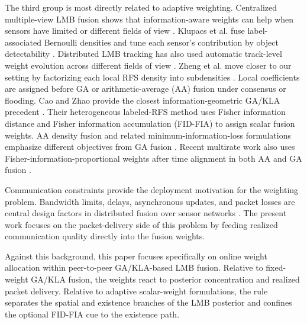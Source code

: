 The third group is most directly related to adaptive weighting. Centralized multiple-view LMB fusion shows that information-aware weights can help when sensors have limited or different fields of view \cite{Wang2018CentralizedLMBFusion,Gostar2021CentralizedCooperativeLMB}. Klupacs et al. fuse label-associated Bernoulli densities and tune each sensor's contribution by object detectability \cite{Klupacs2023ComplementaryFusion}. Distributed LMB tracking has also used automatic track-level weight evolution across different fields of view \cite{Shen2022ConsensusLMB}. Zheng et al. move closer to our setting by factorizing each local RFS density into subdensities \cite{Zheng2026DistributedWeightedRFS}. Local coefficients are assigned before GA or arithmetic-average (AA) fusion under consensus or flooding. Cao and Zhao provide the closest information-geometric GA/KLA precedent \cite{CaoZhao2025InfoGeometryFusion}. Their heterogeneous labeled-RFS method uses Fisher information distance and Fisher information accumulation (FID-FIA) to assign scalar fusion weights. AA density fusion and related minimum-information-loss formulations emphasize different objectives from GA fusion \cite{Li2024AADensityFusion,LiCorchadoSun2017GCIAlternative,Gao2020MIL,Uney2019FiniteSetConsistency}. Recent multirate work also uses Fisher-information-proportional weights after time alignment in both AA and GA fusion \cite{Li2026FIMultirateAADensityFusion}.

Communication constraints provide the deployment motivation for the weighting problem. Bandwidth limits, delays, asynchronous updates, and packet losses are central design factors in distributed fusion over sensor networks \cite{Zhang2016CommConstrainedFusion}. The present work focuses on the packet-delivery side of this problem by feeding realized communication quality directly into the fusion weights.

Against this background, this paper focuses specifically on online weight allocation within peer-to-peer GA/KLA-based LMB fusion. Relative to fixed-weight GA/KLA fusion, the weights react to posterior concentration and realized packet delivery. Relative to adaptive scalar-weight formulations, the rule separates the spatial and existence branches of the LMB posterior and confines the optional FID-FIA cue to the existence path.
